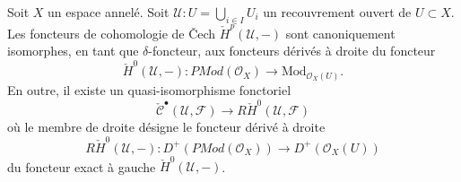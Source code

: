 \begin{lemma}

\label{lemma-cech-cohomology-derived-presheaves}
Soit $X$ un espace annelé. Soit $\mathcal{U} : U = \bigcup_{i \in I} U_i$ un recouvrement ouvert de $U \subset X$. Les foncteurs de cohomologie de {\v C}ech $\check{H}^p(\mathcal{U}, -)$ sont canoniquement isomorphes, en tant que $\delta$-foncteur, aux foncteurs dérivés à droite du foncteur $$
\check{H}^0(\mathcal{U}, -) :
\textit{PMod}(\mathcal{O}_X)
\longrightarrow
\text{Mod}_{\mathcal{O}_X(U)}.
$$ En outre, il existe un quasi-isomorphisme fonctoriel $$
\check{\mathcal{C}}^\bullet(\mathcal{U}, \mathcal{F})
\longrightarrow
R\check{H}^0(\mathcal{U}, \mathcal{F})
$$ où le membre de droite désigne le foncteur dérivé à droite $$
R\check{H}^0(\mathcal{U}, -) :
D^{+}(\textit{PMod}(\mathcal{O}_X))
\longrightarrow
D^{+}(\mathcal{O}_X(U))
$$ du foncteur exact à gauche $\check{H}^0(\mathcal{U}, -)$.
\end{lemma}


